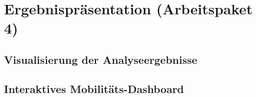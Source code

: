 \newpage

\section{Ergebnispräsentation (Arbeitspaket 4)}
\label{ergebnispraesentation}

\subsection{Visualisierung der Analyseergebnisse}
\label{visualisierung_der_analyseergebnisse}

\subsection{Interaktives Mobilitäts-Dashboard}
\label{interaktives_mobilitaets_dashboard}
